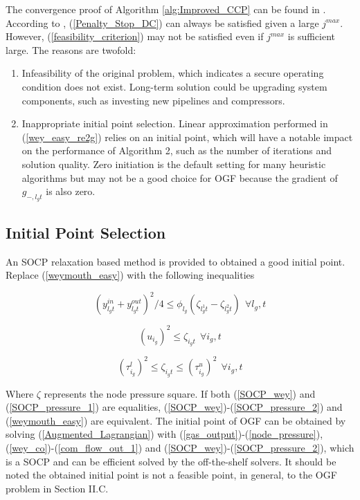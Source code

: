 \documentclass[journal]{IEEEtran}
\begin{document}
The convergence proof of Algorithm \ref{alg:Improved_CCP} can be found in \cite{Boyd_CCP}. According to \cite{Boyd_CCP}, (\ref{Penalty_Stop_DC}) can always be satisfied given a large $j^{max}$. However, (\ref{feasibility_criterion}) may not be satisfied even if $j^{max}$ is sufficient large. The reasons are twofold:
\begin{enumerate}
\item Infeasibility of the original problem, which indicates a secure operating condition does not exist. Long-term solution could be upgrading system components, such as investing new pipelines and compressors.

\item Inappropriate initial point selection. Linear approximation performed in (\ref{wey_easy_re2g}) relies on an initial point, which will have a notable impact on the performance of Algorithm 2, such as the number of iterations and solution quality. Zero initiation is the default setting for many heuristic algorithms but may not be a good choice for OGF because the gradient of $g_{-,l_gt}$
is also zero.
\end{enumerate}

\subsection{Initial Point Selection}
An SOCP relaxation based method is provided to obtained a good initial point. Replace (\ref{weymouth_easy}) with the following inequalities

\begin{spacing}{0.5}
\begin{equation}\label{SOCP_wey}
  (y^{in}_{l_gt}+y^{out}_{l_gt})^2/4\le \phi_{l_g}(\zeta_{l_g^1t}-\zeta_{l_g^2t})~~\forall l_g,t
\end{equation}

\begin{equation}\label{SOCP_pressure_1}
  (u_{i_g})^2 \le \zeta_{i_gt}~~\forall i_g,t
\end{equation}

\begin{equation}\label{SOCP_pressure_2}
  (\tau_{i_g}^l)^2\le \zeta_{i_gt} \le (\tau_{i_g}^u)^2~~\forall i_g,t
\end{equation}
\end{spacing}
\vspace{6pt}
\noindent Where $\zeta$ represents the node pressure square. If both (\ref{SOCP_wey}) and (\ref{SOCP_pressure_1}) are equalities, (\ref{SOCP_wey})-(\ref{SOCP_pressure_2}) and (\ref{weymouth_easy}) are equivalent. The initial point of OGF can be obtained by solving (\ref{Augmented_Lagrangian}) with (\ref{gas_output})-(\ref{node_pressure}), (\ref{wey_co})-(\ref{com_flow_out_1}) and (\ref{SOCP_wey})-(\ref{SOCP_pressure_2}), which is a SOCP and can be efficient solved by the off-the-shelf solvers. It should be noted the obtained initial point is not a feasible point, in general, to the OGF problem in Section II.C.
\end{document}
